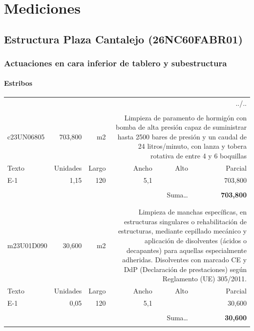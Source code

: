 \documentclass{book}%
\begin{document}
%
\normalsize%
\doparttoc%
\part{Mediciones}%
\chapter{Estructura Plaza Cantalejo (26NC60FABR01)}%
\section{Actuaciones en cara inferior de tablero y subestructura}%
\subsection{Estribos}%
\begin{longtable}{lrrrrr}%
\multicolumn{6}{r}{../..}\\%
\endfoot%
\endlastfoot%
&&&&&\\%
c23UN06805&   703,800& m2&\multicolumn{3}{p{6cm}}{\scriptsize Limpieza de paramento de hormigón con bomba de alta presión capaz de suministrar hasta 2500 bares de presión y un caudal de 24 litros/minuto, con lanza y tobera rotativa de entre 4 y 6 boquillas\normalsize}\\%
Texto&Unidades&Largo&Ancho&Alto&Parcial\\%
\hline%
\multicolumn{1}{p{3.5cm}}{E{-}1}&1,15&120&5,1&&   703,800\\%
&&&&&\\%
\multicolumn{5}{r}{Suma\ldots}&\textbf{   703,800}\\%
\hline%
&&&&&\\%
&&&&&\\%
m23U01D090&    30,600& m2&\multicolumn{3}{p{6cm}}{\scriptsize Limpieza de manchas específicas, en estructuras singulares o rehabilitación de estructuras, mediante cepillado mecánico y aplicación de disolventes (ácidos o decapantes) para aquellas especialmente adheridas. Disolventes con marcado CE y DdP (Declaración de prestaciones) según Reglamento (UE) 305/2011.\normalsize}\\%
Texto&Unidades&Largo&Ancho&Alto&Parcial\\%
\hline%
\multicolumn{1}{p{3.5cm}}{E{-}1}&0,05&120&5,1&&    30,600\\%
&&&&&\\%
\multicolumn{5}{r}{Suma\ldots}&\textbf{    30,600}\\%
\hline%
&&&&&\\%

\end{longtable}
\end{document}
